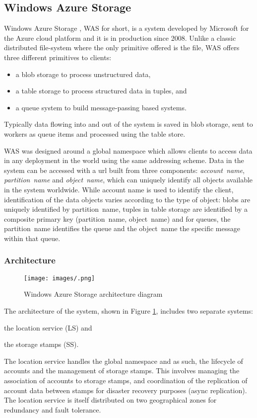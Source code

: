 \subsection{Windows Azure Storage}
Windows Azure Storage \cite{DBLP:conf/sosp/CalderWONSMXSWSHUKEBMAAHHBDAMSMR11}, WAS for short, is a system developed by Microsoft for the Azure cloud platform and it is in production since 2008.
Unlike a classic distributed file-system where the only primitive offered is the file, WAS offers three different primitives to clients:
\begin{itemize}
    \item a blob storage to process unstructured data,
    \item a table storage to process structured data in tuples, and
    \item a queue system to build message-passing based systems.
\end{itemize}
Typically data flowing into and out of the system is saved in blob storage, sent to workers as queue items and processed using the table store.

WAS was designed around a global namespace which allows clients to access data in any deployment in the world using the same addressing scheme.
Data in the system can be accessed with a url built from three components: \emph{account~name}, \emph{partition~name} and \emph{object~name}, which can uniquely identify all objects available in the system worldwide.
While account name is used to identify the client, identification of the data objects varies according to the type of object: blobs are uniquely identified by partition~name, tuples in table storage are identified by a composite primary key (partition~name, object~name) and for queues, the partition~name identifies the queue and the object~name the specific message within that queue.

\subsubsection{Architecture}
\begin{figure}[h]
\caption{Windows Azure Storage architecture diagram}
\label{fig:was-architecture}
\centering
\texttt{[image: images/.png]}
\end{figure}

The architecture of the system, shown in Figure \ref{fig:was-architecture}, includes two separate systems:
\begin{inparaenum}[i)]
    \item the location service (LS) and
    \item the storage stamps (SS).
\end{inparaenum}
The location service handles the global namespace and as such, the lifecycle of accounts and the management of storage stamps.
This involves managing the association of accounts to storage stamps, and coordination of the replication of account data between stamps for disaster recovery purposes (async replication).
The location service is itself distributed on two geographical zones for redundancy and fault tolerance.

